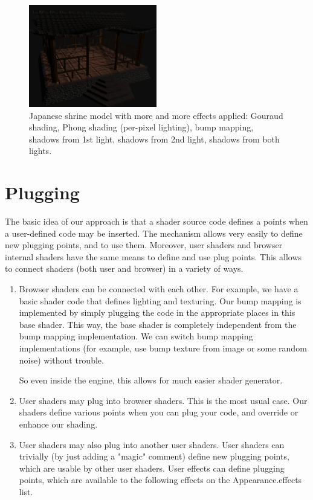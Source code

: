 \documentclass{acmsiggraph}                     %
\newenvironment{myenumerate}
{\begin{enumerate}
  \setlength{\itemsep}{0pt}
  \setlength{\parskip}{0pt}
  \setlength{\parsep}{0pt}}
{\end{enumerate}}
\begin{document}
\begin{figure}[t]
  \includegraphics[width=2.2in]{rhan_shrine_5_everything}
  \caption{Japanese shrine model with more and more effects applied: Gouraud shading,
Phong shading (per-pixel lighting), bump mapping, shadows from 1st light,
shadows from 2nd light, shadows from both lights.}
\end{figure}

\section{Plugging}

The basic idea of our approach is that a shader source code defines
a points when a user-defined code may be inserted. The mechanism
allows very easily to define new plugging points, and to use
them. Moreover, user shaders and browser internal shaders have the
same means to define and use plug points. This allows to connect
shaders (both user and browser) in a variety of ways.

\begin{myenumerate}
\itemsep 0pt
\item Browser shaders can be connected with each other. For example, we
have a basic shader code that defines lighting and texturing. Our bump
mapping is implemented by simply plugging the code in the appropriate
places in this base shader. This way, the base shader is completely
independent from the bump mapping implementation. We can switch bump
mapping implementations (for example, use bump texture from image or
some random noise) without trouble.

So even inside the engine, this allows for much easier shader generator.

\item User shaders may plug into browser shaders. This is the most usual
case. Our shaders define various points when you can plug your code,
and override or enhance our shading.

\item User shaders may also plug into another user shaders. User shaders
can trivially (by just adding a "magic" comment) define new plugging
points, which are usable by other user shaders. User effects can
define plugging points, which are available to the following effects
on the Appearance.effects list.

\end{myenumerate}
\end{document}
